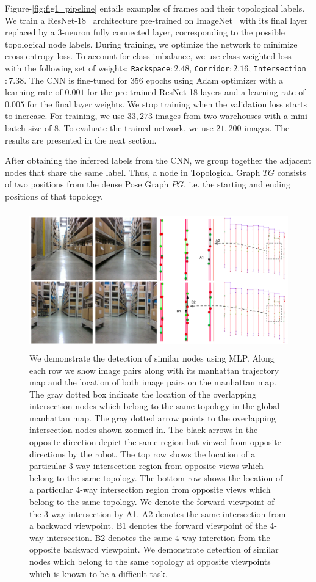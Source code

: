 \documentclass[letterpaper, 10 pt, conference]{ieeeconf}  %
\begin{document}
	Figure-\ref{fig:fig1_pipeline} entails examples of frames and their topological labels. We train a ResNet-18~\cite{he2016deep} architecture pre-trained on ImageNet~\cite{imagenet_cvpr09} with its final layer replaced by a $3$-neuron fully connected layer, corresponding to the possible topological node labels. During training, we optimize the network to minimize cross-entropy loss. To account for class imbalance, we use class-weighted loss~\cite{johnson2019survey} with the following set of weights: \texttt{Rackspace}$:2.48$, \texttt{Corridor}$:2.16$, \texttt{Intersection}$:7.38$. The CNN is fine-tuned for $356$ epochs using Adam optimizer with a learning rate of $0.001$ for the pre-trained ResNet-18 layers and a learning rate of $0.005$ for the final layer weights. We stop training when the validation loss starts to increase. For training, we use $33{,}273$ images from two warehouses with a mini-batch size of $8$. To evaluate the trained network, we use $21{,}200$ images. The results are presented in the next section.
	
	After obtaining the inferred labels from the CNN, we group together the adjacent nodes that share the same label. Thus, a node in Topological Graph $TG$ consists of two positions from the dense Pose Graph $PG$, i.e.  the starting and ending positions of that topology.  
	
	\begin{figure}
		\includegraphics[width=480px, height=6cm]{pic/diff_images_flipped.png}
		\caption{We demonstrate the detection of similar nodes using MLP. Along each row we show image pairs along with its manhattan trajectory map and the location of both image pairs on the manhattan map. The gray dotted box indicate the location of the overlapping intersection nodes which belong to the same topology in the global manhattan map. The gray dotted arrow points to the overlapping intersection nodes shown zoomed-in. The black arrows in the opposite direction depict the same region but viewed from opposite directions by the robot. The top row shows the location of a particular 3-way intersection region from opposite views which belong to the same topology. The bottom row shows the location of a particular 4-way intersection region from opposite views which belong to the same topology. We denote the forward viewpoint of the 3-way intersection by A1. A2 denotes the same intersection from a backward viewpoint. B1 denotes the forward viewpoint of the 4-way intersection. B2 denotes the same 4-way interction from the opposite backward viewpoint. We demonstrate detection of similar nodes which belong to the same topology at opposite viewpoints which is known to be a difficult task.}
		\label{fig:boat22}
	\end{figure} 
\end{document}
